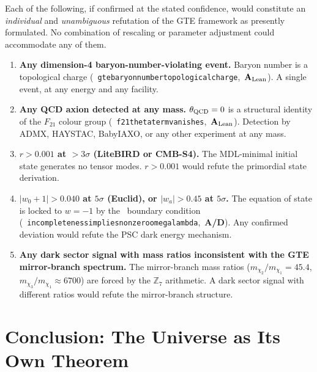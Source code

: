 \documentclass[11pt,openany]{book}
\theoremstyle{remark}
\newcommand{\PSC}{\text{PSC}}
\newcommand{\ZS}{\mathbb{Z}_7}
\newcommand{\lean}[1]{%
  \penalty-100
  \begingroup\def\_{\textunderscore\allowbreak}\texttt{#1}\endgroup}
\newcommand{\CatAL}{\ensuremath{\textbf{A}_{\rm Lean}}}
\newcommand{\CatAD}{\textbf{A/D}}
\begin{document}
\FloatBarrier

\begin{tcolorbox}[colback=red!5,colframe=red!60,
  title={Five Observations That Would Individually Refute GTE}]
Each of the following, if confirmed at the stated confidence, would constitute an
\emph{individual} and \emph{unambiguous} refutation of the GTE framework as
presently formulated.  No combination of rescaling or parameter adjustment could
accommodate any of them.
\begin{enumerate}
\item \textbf{Any dimension-4 baryon-number-violating event.}
  Baryon number is a topological charge \mbox{(\lean{gte\_baryon\_number\_topological\_charge}, \CatAL)}.  A single event, at any energy and any facility.

\item \textbf{Any QCD axion detected at any mass.}
  $\theta_{\rm QCD} = 0$ is a structural identity of the $F_{21}$ colour group \mbox{(\lean{f21\_theta\_term\_vanishes}, \CatAL)}.  Detection by ADMX, HAYSTAC,
  BabyIAXO, or any other experiment at any mass.

\item \textbf{$r > 0.001$ at $>3\sigma$ (LiteBIRD or CMB-S4).}
  The MDL-minimal initial state generates no tensor modes.  $r > 0.001$ would
  refute the primordial state derivation.

\item \textbf{$|w_0 + 1| > 0.040$ at $5\sigma$ (Euclid), or $|w_a| > 0.45$ at $5\sigma$.}
  The equation of state is locked to $w = -1$ by the \PSC\ boundary condition
  \mbox{(\lean{incompleteness\_implies\_nonzero\_omega\_lambda}, \CatAD)}.  Any confirmed
  deviation would refute the PSC dark energy mechanism.

\item \textbf{Any dark sector signal with mass ratios inconsistent with the GTE
  mirror-branch spectrum.}
  The mirror-branch mass ratios ($m_{\chi_2}/m_{\chi_1} = 45.4$,
  $m_{\chi_3}/m_{\chi_1} \approx 6700$) are forced by the $\ZS$ arithmetic.
  A dark sector signal with different ratios would refute the mirror-branch structure.
\end{enumerate}
\end{tcolorbox}

\chapter[The Universe as Its Own Theorem]{Conclusion: The Universe as Its Own Theorem}
\label{chap:conclusion}
\end{document}
